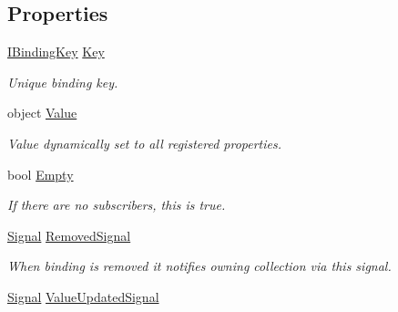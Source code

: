 \subsection*{Properties}
\begin{DoxyCompactItemize}
\item 
\mbox{\hyperlink{interfacecp_games_1_1core_1_1_rapid_m_v_c_1_1_i_binding_key}{I\+Binding\+Key}} \mbox{\hyperlink{interfacecp_games_1_1core_1_1_rapid_m_v_c_1_1_i_binding_aa61ee9cd1b44e221f1ae28f9552792c7}{Key}}
\begin{DoxyCompactList}\small\item\em Unique binding key. \end{DoxyCompactList}\item 
object \mbox{\hyperlink{interfacecp_games_1_1core_1_1_rapid_m_v_c_1_1_i_binding_a7ec4a6dc07e378d9ffd775b4d6b387f7}{Value}}
\begin{DoxyCompactList}\small\item\em Value dynamically set to all registered properties. \end{DoxyCompactList}\item 
bool \mbox{\hyperlink{interfacecp_games_1_1core_1_1_rapid_m_v_c_1_1_i_binding_ad4ea0596cb7a0ef820717785e1e5a4ef}{Empty}}
\begin{DoxyCompactList}\small\item\em If there are no subscribers, this is true. \end{DoxyCompactList}\item 
\mbox{\hyperlink{classcp_games_1_1core_1_1_rapid_m_v_c_1_1_signal}{Signal}} \mbox{\hyperlink{interfacecp_games_1_1core_1_1_rapid_m_v_c_1_1_i_binding_afc250797ed507d05b9b611f4d63cd345}{Removed\+Signal}}
\begin{DoxyCompactList}\small\item\em When binding is removed it notifies owning collection via this signal. \end{DoxyCompactList}\item 
\mbox{\hyperlink{classcp_games_1_1core_1_1_rapid_m_v_c_1_1_signal}{Signal}} \mbox{\hyperlink{interfacecp_games_1_1core_1_1_rapid_m_v_c_1_1_i_binding_a24032f62e91ba7f08581be9afd09b2c7}{Value\+Updated\+Signal}}

\end{DoxyCompactItemize}
